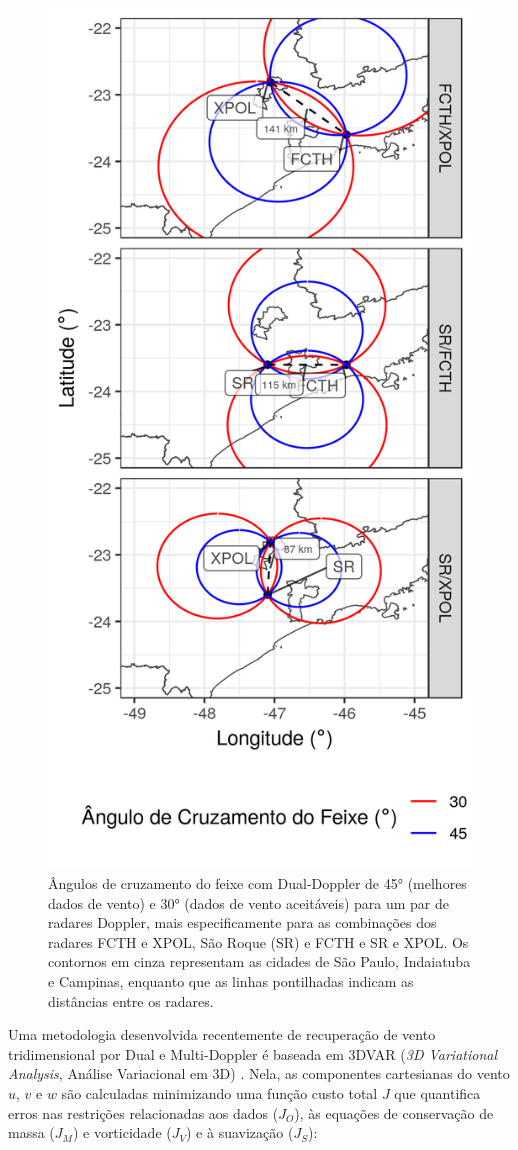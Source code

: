 \begin{figure}[hp]
	\begin{center}
		\caption{Ângulos de cruzamento do feixe com Dual-Doppler de \ang{45} (melhores dados de vento) e \ang{30} (dados de vento aceitáveis) para um par de radares Doppler, mais especificamente para as combinações dos radares FCTH e XPOL, São Roque (SR) e FCTH e SR e XPOL. Os contornos em cinza representam as cidades de São Paulo, Indaiatuba e Campinas, enquanto que as linhas pontilhadas indicam as distâncias entre os radares.} 
		\label{doppler_lobes}
		\includegraphics[width=0.65\columnwidth]{../General_Processing/figures/dual_doppler_lobes_ptbr.png}
	\end{center}
\end{figure}

Uma metodologia desenvolvida recentemente de recuperação de vento tridimensional por Dual e Multi-Doppler é baseada em 3DVAR (\textit{3D Variational Analysis}, Análise Variacional em 3D) \cite{Shapiro2009, Potvin2012b}. Nela, as componentes cartesianas do vento $u$, $v$ e $w$ são calculadas minimizando uma função custo total $J$ que quantifica erros nas restrições relacionadas aos dados ($J_O$), às equações de conservação de massa ($J_M$) e vorticidade ($J_V$) e à suavização ($J_S$):

